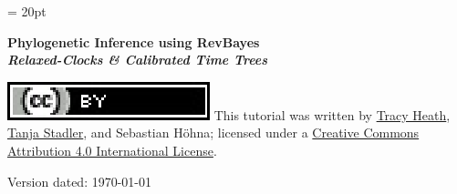 \documentclass[11pt]{article}
\begin{document}
\renewcommand{\headrulewidth}{0.5pt}
\headsep = 20pt
\lhead{ }

\thispagestyle{plain}
\begin{center}

\textbf{\LARGE Phylogenetic Inference using RevBayes}\\\vspace{2mm}
\textbf{\it{\Large Relaxed-Clocks \& Calibrated Time Trees}}\\\vspace{2mm}
\end{center}



\href{http://creativecommons.org/licenses/by/4.0/}{\includegraphics[scale=0.8]{../shared_figures/ccby.eps}} This tutorial was written by \href{http://phyloworks.org/}{Tracy Heath}, \href{http://www.bsse.ethz.ch/cevo}{Tanja Stadler}, and Sebastian H\"{o}hna; licensed under a \href{http://creativecommons.org/licenses/by/4.0/}{Creative Commons Attribution 4.0 International License}. 



Version dated: \today



\printbibliography[heading=relevref]
\end{document}
